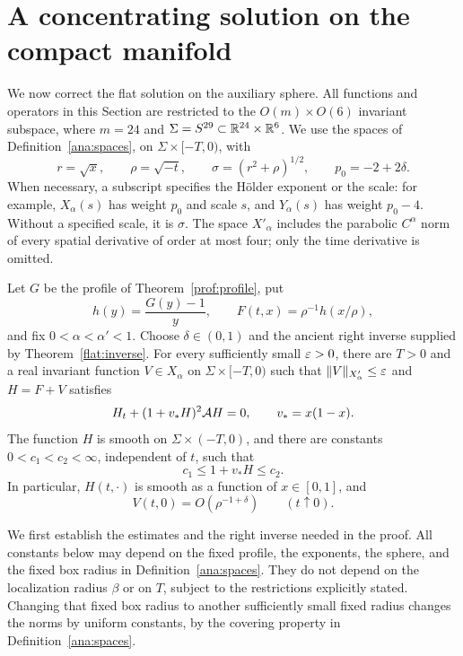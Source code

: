 \section{A concentrating solution on the compact manifold}
\label{glue:section}
\label{sec:compact}

We now correct the flat solution on the auxiliary sphere.  All functions and
operators in this Section are restricted to the
$O(m)\times O(6)$ invariant subspace, where $m=24$ and
$\Sigma=S^{29}\subset\mathbb{R}^{24}\times\mathbb{R}^6$.  We use the spaces of
Definition~\ref{ana:spaces}, on $\Sigma\times[-T,0)$, with
\[
 r=\sqrt{x},\qquad \rho=\sqrt{-t},\qquad
 \sigma=(r^2+\rho)^{1/2},\qquad p_0=-2+2\delta.
\]
When necessary, a subscript specifies the H\"older exponent or the scale:
for example, $X_\alpha(s)$ has weight $p_0$ and scale $s$, and
$Y_\alpha(s)$ has weight $p_0-4$.  Without a specified scale, it is
$\sigma$.  The space $X'_\alpha$ includes the parabolic
$C^\alpha$ norm of every spatial derivative of order at most four; only
the time derivative is omitted.

\begin{theorem}\label{glue:solution}
Let $G$ be the profile of Theorem~\ref{prof:profile}, put
\[
 h(y)=\frac{G(y)-1}{y},\qquad
 F(t,x)=\rho^{-1}h(x/\rho),
\]
and fix $0<\alpha<\alpha'<1$.  Choose $\delta\in(0,1)$ and the ancient
right inverse supplied by Theorem~\ref{flat:inverse}.  For every
sufficiently small $\varepsilon>0$, there are $T>0$ and a real invariant
function $V\in X_\alpha$ on $\Sigma\times[-T,0)$ such that
$\lVert V\rVert_{X'_\alpha}\le\varepsilon$ and $H=F+V$ satisfies
\begin{equation}\label{glue:equation}
 H_t+(1+v_*H)^2\mathcal A H=0,\qquad v_*=x(1-x).
\end{equation}
The function $H$ is smooth on $\Sigma\times(-T,0)$, and there are
constants $0<c_1<c_2<\infty$, independent of $t$, such that
\begin{equation}\label{glue:positive}
 c_1\le 1+v_*H\le c_2.
\end{equation}
In particular, $H(t,\cdot)$ is smooth as a function of $x\in[0,1]$, and
\begin{equation}\label{glue:center}
 V(t,0)=O(\rho^{-1+\delta})\qquad(t\uparrow0).
\end{equation}
\end{theorem}

We first establish the estimates and the right inverse needed in the
proof.  All constants below may depend on the fixed profile, the
exponents, the sphere, and the fixed box radius in
Definition~\ref{ana:spaces}.  They do not depend on the localization
radius $\beta$ or on $T$, subject to the restrictions explicitly stated.
Changing that fixed box radius to another sufficiently small fixed
radius changes the norms by uniform constants, by the covering property
in Definition~\ref{ana:spaces}.

